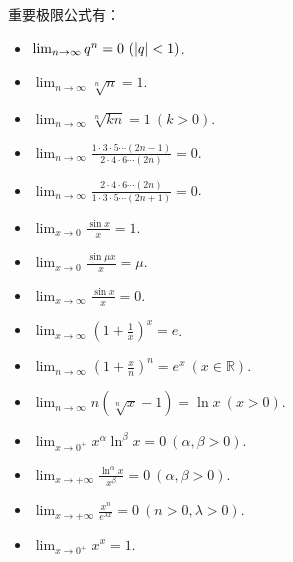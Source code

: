 重要极限公式有：
\begin{itemize}
	\item \(\lim_{n\to\infty} q^n=0\ (\abs{q}<1)\).%
	\item \(\lim_{n\to\infty} \sqrt[n]{n}=1\).%
	\item \(\lim_{n\to\infty} \sqrt[n]{k n} = 1\ (k>0)\).%
	\item \(\lim_{n\to\infty} \frac{1 \cdot 3 \cdot 5 \dotsm (2n-1)}{2 \cdot 4 \cdot 6 \dotsm (2n)} = 0\).%
	\item \(\lim_{n\to\infty} \frac{2 \cdot 4 \cdot 6 \dotsm (2n)}{1 \cdot 3 \cdot 5 \dotsm (2n+1)} = 0\).%
	\item \(\lim_{x\to0} \frac{\sin x}{x} = 1\).%
	\item \(\lim_{x\to0} \frac{\sin \mu x}{x}=\mu\).
	\item \(\lim_{x\to\infty} \frac{\sin x}{x} = 0\).
	\item \(\lim_{x\to\infty} \left(1+\frac1x\right)^x = e\).%
	\item \(\lim_{n\to\infty} \left(1+\frac{x}{n}\right)^n=e^x\ (x\in\mathbb{R})\).%
	\item \(\lim_{n\to\infty} n\left(\sqrt[n]{x}-1\right)=\ln x\ (x>0)\).%
	\item \(\lim_{x\to0^+} x^\alpha \ln^\beta x = 0\ (\alpha,\beta > 0)\).%
	\item \(\lim_{x\to+\infty} \frac{\ln^\alpha x}{x^\beta} = 0\ (\alpha,\beta>0)\).%
	\item \(\lim_{x\to+\infty} \frac{x^n}{e^{\lambda x}}=0\ (n>0,\lambda>0)\).%
	\item \(\lim_{x\to0^+} x^x = 1\).%
\end{itemize}

